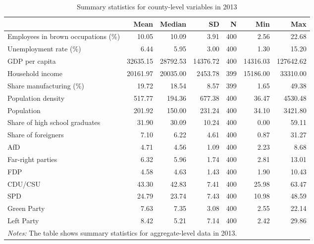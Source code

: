 \begin{table}[h]
\centering\centering
\caption{\label{tab:sum}Summary statistics for county-level variables in 2013}
\centering
\fontsize{8}{10}\selectfont
\begin{tabular}[t]{lrrrrrr}
\toprule
 & Mean & Median & SD & N & Min & Max\\
\midrule
Employees in brown occupations (\%) & 10.05 & 10.09 & 3.91 & 400 & 2.56 & 22.68\\
Unemployment rate (\%) & 6.44 & 5.95 & 3.00 & 400 & 1.30 & 15.20\\
GDP per capita & 32635.15 & 28792.53 & 14376.72 & 400 & 14316.03 & 127642.62\\
Household income & 20161.97 & 20035.00 & 2453.78 & 399 & 15186.00 & 33310.00\\
Share manufacturing (\%) & 19.72 & 18.54 & 8.57 & 399 & 1.65 & 49.38\\
Population density & 517.77 & 194.36 & 677.38 & 400 & 36.47 & 4530.48\\
Population & 201.92 & 150.00 & 231.24 & 400 & 34.10 & 3421.80\\
Share of high school graduates & 31.90 & 30.09 & 10.24 & 400 & 0.00 & 59.11\\
Share of foreigners & 7.10 & 6.22 & 4.61 & 400 & 0.87 & 31.27\\
AfD & 4.71 & 4.56 & 1.09 & 400 & 2.23 & 8.68\\
Far-right parties & 6.32 & 5.96 & 1.74 & 400 & 2.81 & 13.01\\
FDP & 4.58 & 4.63 & 1.43 & 400 & 1.90 & 10.43\\
CDU/CSU & 43.30 & 42.83 & 7.41 & 400 & 25.98 & 63.47\\
SPD & 24.79 & 23.74 & 7.43 & 400 & 10.98 & 48.59\\
Green Party & 7.63 & 7.35 & 3.08 & 400 & 2.55 & 22.14\\
Left Party & 8.42 & 5.21 & 7.14 & 400 & 2.42 & 29.86\\
\bottomrule
\multicolumn{7}{l}{\rule{0pt}{1em}\textit{Notes: } The table shows summary statistics for aggregate-level data in 2013.}\\
\end{tabular}
\end{table}
